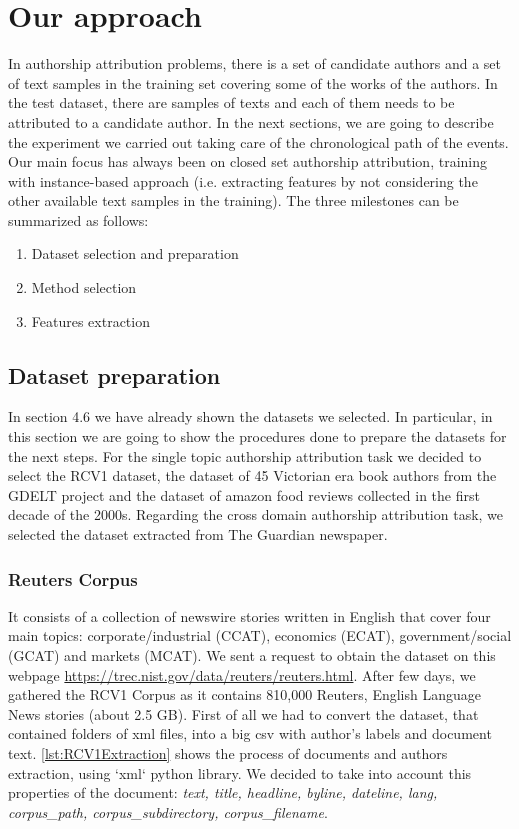 \chapter{Our approach}
In authorship attribution problems, there is a set of candidate authors and a set of
text samples in the training set covering some of the works of the authors. In the
test dataset, there are samples of texts and each of them needs to be attributed to
a candidate author.
In the next sections, we are going to describe the experiment we carried out taking care of the chronological path of the events.
Our main focus has always been on closed set authorship attribution, training with instance-based approach (i.e. extracting features by not considering the other available text samples in the training).
The three milestones can be summarized as follows:
\begin{enumerate}
	\item Dataset selection and preparation
	\item Method selection
	\item Features extraction
\end{enumerate}

\section{Dataset preparation}
In section 4.6 we have already shown the datasets we selected. In particular, in this section we are going to show the procedures done to prepare the datasets for the next steps. For the single topic authorship attribution task we decided to select the RCV1 dataset, the dataset of 45 Victorian era book authors from the GDELT project and the dataset of amazon food reviews collected in the first decade of the 2000s. Regarding the cross domain authorship attribution task, we selected the dataset extracted from The Guardian newspaper.

\subsection{Reuters Corpus}
It consists of a collection of newswire stories written in English that cover four main topics: corporate/industrial (CCAT), economics (ECAT), government/social (GCAT) and markets (MCAT).
We sent a request to obtain the dataset on this webpage \url{https://trec.nist.gov/data/reuters/reuters.html}.
After few days, we gathered the RCV1 Corpus as it contains 810,000 Reuters, English Language News stories (about 2.5 GB).
First of all we had to convert the dataset, that contained folders of xml files, into a big csv with author's labels and document text.
\autoref{lst:RCV1Extraction} shows the process of documents and authors extraction, using `xml` python library. We decided to take into account this properties of the document: \textit{text, title, headline, byline, dateline, lang, corpus\_path, corpus\_subdirectory, corpus\_filename}.


